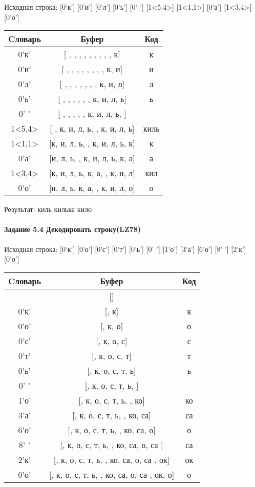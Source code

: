 \documentclass[a4paper, 12pt]{article}
\begin{document}
Исходная строка: [0'к'] [0'и'] [0'л'] [0'ь'] [0' '] [1<5,4>] [1<1,1>] [0'а'] [1<3,4>] [0'о']\\
\begin{table}[h!]
\centering
\begin{tabular}{|c|c|c|}
\hline
 Cловарь & Буфер & Код  \\ \hline
0'к' & [ ,  ,  ,  ,  ,  ,  ,  ,  , к] & к
\\ \hline
0'и' & [ ,  ,  ,  ,  ,  ,  ,  , к, и] & и
\\ \hline
0'л' & [ ,  ,  ,  ,  ,  ,  , к, и, л] & л
\\ \hline
0'ь' & [ ,  ,  ,  ,  ,  , к, и, л, ь] & ь
\\ \hline
0' ' & [ ,  ,  ,  ,  , к, и, л, ь,  ] &  
\\ \hline
1<5,4> & [ , к, и, л, ь,  , к, и, л, ь] & киль
\\ \hline
1<1,1> & [к, и, л, ь,  , к, и, л, ь, к] & к
\\ \hline
0'а' & [и, л, ь,  , к, и, л, ь, к, а] & а
\\ \hline
1<3,4> & [к, и, л, ь, к, а,  , к, и, л] &  кил
\\ \hline
0'о' & [и, л, ь, к, а,  , к, и, л, о] & о
\\ \hline
\end{tabular}
\end{table}

Результат: киль килька кило
\pagebreak
\paragraph{Задание 5.4 Декодировать строку(LZ78)\\}

Исходная строка: [0'к'] [0'о'] [0'с'] [0'т'] [0'ь'] [0' '] [1'о'] [3'а'] [6'о'] [8' '] [2'к'] [0'о']\\
\begin{table}[h!]
\centering
\begin{tabular}{|c|c|c|}
\hline
 Cловарь & Буфер & Код  \\ \hline
 & [] & 
\\ \hline
0'к' & [, к] & к
\\ \hline
0'о' & [, к, о] & о
\\ \hline
0'с' & [, к, о, с] & с
\\ \hline
0'т' & [, к, о, с, т] & т
\\ \hline
0'ь' & [, к, о, с, т, ь] & ь
\\ \hline
0' ' & [, к, о, с, т, ь,  ] &  
\\ \hline
1'о' & [, к, о, с, т, ь,  , ко] & ко
\\ \hline
3'а' & [, к, о, с, т, ь,  , ко, са] & са
\\ \hline
6'о' & [, к, о, с, т, ь,  , ко, са,  о] &  о
\\ \hline
8' ' & [, к, о, с, т, ь,  , ко, са,  о, са ] & са 
\\ \hline
2'к' & [, к, о, с, т, ь,  , ко, са,  о, са , ок] & ок
\\ \hline
0'о' & [, к, о, с, т, ь,  , ко, са,  о, са , ок, о] & о
\\ \hline
\end{tabular}
\end{table}
\end{document}
